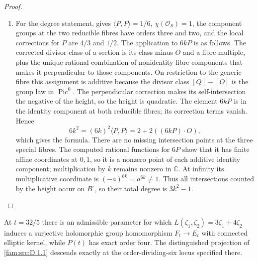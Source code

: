 \begin{proof}
\begin{enumerate}[label=\arabic*.,leftmargin=*]
\item For the degree statement, \cite[Lemma~2.1, pp.~3--4, with the height computation on p.~4]{Engel2026} gives \(\langle P,P\rangle=1/6\),
\(\chi(\mathcal O_S)=1\), the component groups at the two reducible fibres
have orders three and two, and the local corrections for \(P\) are
\(4/3\) and \(1/2\). The application to \(6kP\) is as follows.
The corrected divisor class of a section is its class minus \(O\) and
a fibre multiple, plus the unique rational combination of nonidentity
fibre components that makes it perpendicular to those components.
On restriction to the generic fibre this assignment is additive because
the divisor class \([Q]-[O]\) is the group law in \(\operatorname{Pic}^0\).
The perpendicular correction makes its self-intersection the negative of
the height, so the height is quadratic. The element \(6kP\) is in the
identity component at both reducible fibres; its correction terms vanish.
Hence
\[
 6k^2=(6k)^2\langle P,P\rangle
 =2+2((6kP)\mathbin{\cdot}O),
\]
which gives the formula. There are no missing intersection points at the
three special fibres. The computed rational functions for \(6P\) show
that it has finite affine coordinates at \(0,1\), so it is a nonzero point
of each additive identity component; multiplication by \(k\) remains
nonzero in \(\mathbb C\). At infinity its multiplicative coordinate is
\((-a)^{6k}=a^{6k}\ne1\). Thus all intersections counted by the height
occur on \(B^\circ\), so their total degree is \(3k^2-1\).
\end{enumerate}
\end{proof}





\begin{theorem}\hypertarget{tag-01QT}{}\label{fam:src:D.1.3}\label{fam:st:D.1.3}

At \(t=32/5\) there is an admissible parameter for which
\(L(\zeta_1,\zeta_2)=3\zeta_1+4\zeta_2\) induces a surjective
holomorphic group homomorphism \(F_t\to E_t\) with connected elliptic
kernel, while \(P(t)\) has exact order four. The distinguished
projection of \ref{fam:src:D.1.1} descends exactly at the order-dividing-six
locus specified there.
\end{theorem}


